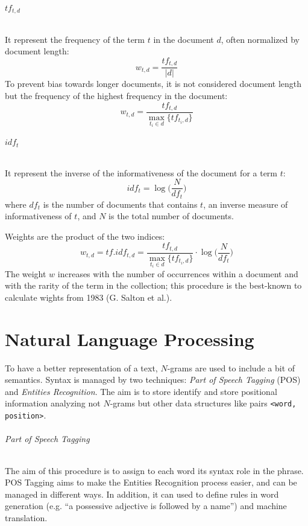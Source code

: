 \documentclass[11pt, a4page]{article}
\begin{document}
\paragraph{$tf_{t, d}$} It represent the frequency of the term $t$ in the document $d$, often normalized by document length:
\begin{equation*}
  w_{t, d} = \frac{tf_{t, d}}{|d|}
\end{equation*}
To prevent bias towards longer documents, it is not considered document length but the frequency of the highest frequency in the document:
\begin{equation*}
  w_{t, d} = \frac{tf_{t, d}}{\displaystyle \max_{t_i \in d} \{tf_{t_i, d}\}}
\end{equation*}

\paragraph{$idf_t$} It represent the inverse of the informativeness of the document for a term $t$:
\begin{equation*}
  idf_t = \log \Big( \frac{N}{df_t} \Big)
\end{equation*}
where $df_t$ is the number of documents that contains $t$, an inverse measure of informativeness of $t$, and $N$ is the total number of documents.
\newline

Weights are the product of the two indices:
\begin{equation*}
  w_{t, d} = tf.idf_{t, d} = \frac{tf_{t, d}}{\displaystyle \max_{t_i \in d} \{ tf_{t_i, d} \}} \cdot \log \Big(\frac{N}{df_t} \Big)
\end{equation*}
The weight $w$ increases with the number of occurrences within a document and with the rarity of the term in the collection; this procedure is the best-known to calculate wights from 1983 (G. Salton et al.).
\newpage

\part{Natural Language Processing}
To have a better representation of a text, $N$-grams are used to include a bit of semantics.
Syntax is managed by two techniques: \textit{Part of Speech Tagging} (POS) and \textit{Entities Recognition}.
The aim is to store identify and store positional information analyzing not $N$-grams but other data structures like pairs \verb|<word, position>|.

\paragraph{Part of Speech Tagging}
The aim of this procedure is to assign to each word its syntax role in the phrase.
POS Tagging aims to make the Entities Recognition process easier, and can be managed in different ways.
In addition, it can used to define rules in word generation (e.g. ``a possessive adjective is followed by a name'') and machine translation.
\end{document}
